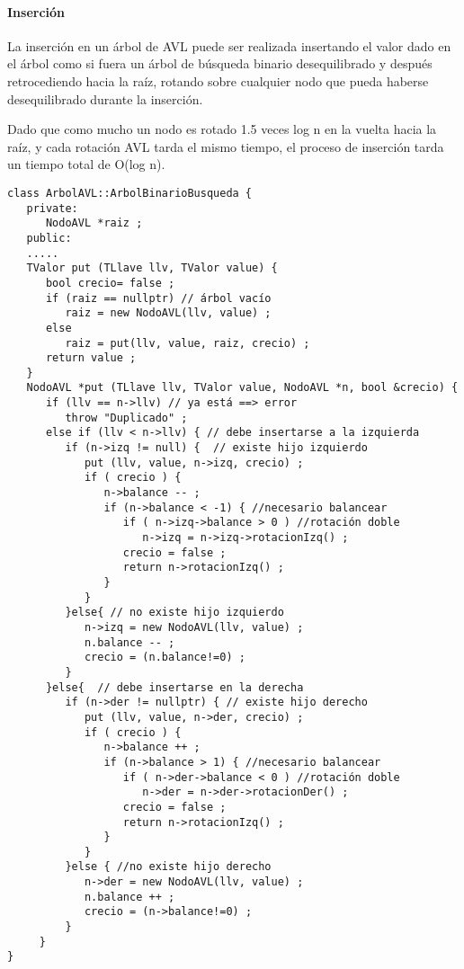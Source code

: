 \paragraph{Inserción}
\label{sec:insercion-1}

La inserción en un árbol de AVL puede ser realizada insertando el
valor dado en el árbol como si fuera un árbol de búsqueda binario
desequilibrado y después retrocediendo hacia la raíz, rotando sobre
cualquier nodo que pueda haberse desequilibrado durante la inserción.

Dado que como mucho un nodo es rotado 1.5 veces log n en la vuelta
hacia la raíz, y cada rotación AVL tarda el mismo tiempo, el proceso
de inserción tarda un tiempo total de O(log n).

\begin{verbatim}
class ArbolAVL::ArbolBinarioBusqueda {
   private:
      NodoAVL *raiz ;
   public:
   .....
   TValor put (TLlave llv, TValor value) {
      bool crecio= false ;
      if (raiz == nullptr) // árbol vacío
         raiz = new NodoAVL(llv, value) ;
      else
         raiz = put(llv, value, raiz, crecio) ;
      return value ;
   }
   NodoAVL *put (TLlave llv, TValor value, NodoAVL *n, bool &crecio) {
      if (llv == n->llv) // ya está ==> error
         throw "Duplicado" ;
      else if (llv < n->llv) { // debe insertarse a la izquierda
         if (n->izq != null) {  // existe hijo izquierdo
            put (llv, value, n->izq, crecio) ;
            if ( crecio ) {
               n->balance -- ;
               if (n->balance < -1) { //necesario balancear
                  if ( n->izq->balance > 0 ) //rotación doble
                     n->izq = n->izq->rotacionIzq() ;
                  crecio = false ;
                  return n->rotacionIzq() ;
               }
            }
         }else{ // no existe hijo izquierdo
            n->izq = new NodoAVL(llv, value) ;
            n.balance -- ;
            crecio = (n.balance!=0) ;
         }
      }else{  // debe insertarse en la derecha
         if (n->der != nullptr) { // existe hijo derecho
            put (llv, value, n->der, crecio) ;
            if ( crecio ) {
               n->balance ++ ;
               if (n->balance > 1) { //necesario balancear
                  if ( n->der->balance < 0 ) //rotación doble
                     n->der = n->der->rotacionDer() ;
                  crecio = false ;
                  return n->rotacionIzq() ;
               }
            }
         }else { //no existe hijo derecho
            n->der = new NodoAVL(llv, value) ;
            n.balance ++ ;
            crecio = (n->balance!=0) ;
         }
     }
} 
\end{verbatim}

